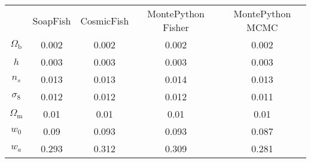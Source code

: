 \begin{table}
\centering
\begin{tabular}{|c|c|c|c|c|}
 & SoapFish & CosmicFish & MontePython Fisher & MontePython MCMC \\
$\Omega_\mathrm{b}$ & 0.002 & 0.002 & 0.002 & 0.002 \\
$h$ & 0.003 & 0.003 & 0.003 & 0.003 \\
$n_s$ & 0.013 & 0.013 & 0.014 & 0.013 \\
$\sigma_8$ & 0.012 & 0.012 & 0.012 & 0.011 \\
$\Omega_\mathrm{m}$ & 0.01 & 0.01 & 0.01 & 0.01 \\
$w_0$ & 0.09 & 0.093 & 0.093 & 0.087 \\
$w_a$ & 0.293 & 0.312 & 0.309 & 0.281 \\
\end{tabular}
\end{table}
